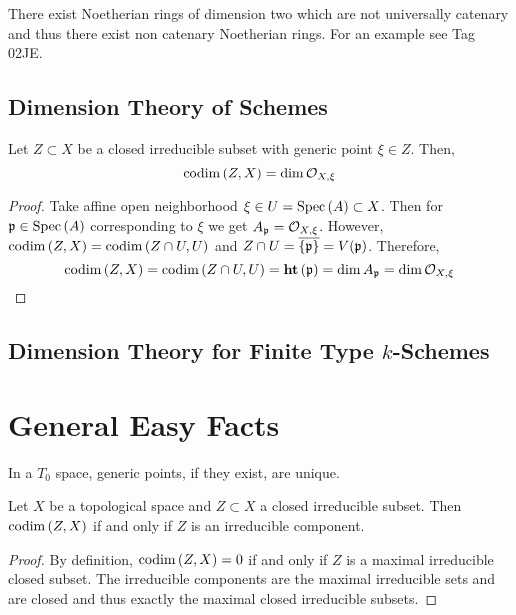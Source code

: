 \documentclass[12pt]{article}
\begin{document}
\begin{example}
There exist Noetherian rings of dimension two which are not universally catenary and thus there exist non catenary Noetherian rings. For an example see Tag 02JE.
\end{example}

\subsection{Dimension Theory of Schemes}

\begin{lemma} \label{codimension_loc_rings}
Let $Z \subset X$ be a closed irreducible subset with generic point $\xi \in Z$. Then,
\[ \mathrm{codim}\left( Z,X \right) = \dim{\mathcal{O}_{X, \xi}} \]
\end{lemma}


\begin{proof}
Take affine open neighborhood $\xi \in U = \mathrm{Spec}\left( A \right) \subset X$. Then for $\mathfrak{p} \in \mathrm{Spec}\left( A \right)$ corresponding to $\xi$ we get $A_{\mathfrak{p}} = \mathcal{O}_{X, \xi}$. However, $\mathrm{codim}\left( Z, X \right) = \mathrm{codim}\left( Z \cap U, U \right)$ and $Z \cap U = \overline{\{ \mathfrak{p} \}} = V(\mathfrak{p})$. Therefore,
\[ \mathrm{codim}\left( Z, X \right) = \mathrm{codim}\left( Z \cap U, U \right) = \mathbf{ht}\left( \mathfrak{p} \right) = \dim{A_{\mathfrak{p}}} = \dim{\mathcal{O}_{X, \xi}} \]
\end{proof}

\subsection{Dimension Theory for Finite Type $k$-Schemes}

\section{General Easy Facts}

\begin{rmk}
In a $T_0$ space, generic points, if they exist, are unique.
\end{rmk}

\begin{prop}
Let $X$ be a topological space and $Z \subset X$ a closed irreducible subset. Then $\mathrm{codim}\left( Z,X \right)$ if and only if $Z$ is an irreducible component.
\end{prop}

\begin{proof}
By definition, $\mathrm{codim}\left( Z,X \right) = 0$ if and only if $Z$ is a maximal irreducible closed subset. The irreducible components are the maximal irreducible sets and are closed and thus exactly the maximal closed irreducible subsets.
\end{proof}
\end{document}
